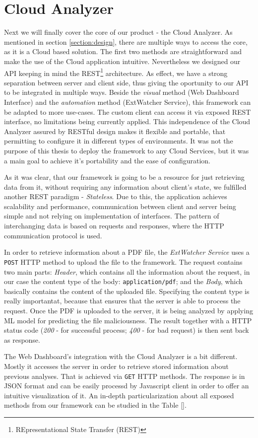 \section{Cloud Analyzer}
\label{section:cloudApi}
Next we will finally cover the core of our product - the Cloud Analyzer. As mentioned in section \ref{section:design}, there are multiple ways to access the core, as it is a Cloud based solution. The first two methods are straightforward and make the use of the Cloud application intuitive. Nevertheless we designed our API keeping in mind the REST\footnote{REpresentational State Transfer (REST)} architecture. As effect, we have a strong separation between server and client side, thus giving the oportunity to our API to be integrated in multiple ways. Beside the \textit{visual} method (Web Dashboard Interface) and the \textit{automation} method (ExtWatcher Service), this framework can be adapted to more use-cases. The custom client can access it via exposed REST interface, no limitations being currently applied. This independence of the Cloud Analyzer assured by RESTful design makes it flexible and portable, that permitting to configure it in different types of environments. It was not the purpose of this thesis to deploy the framework to any Cloud Services, but it was a main goal to achieve it's portability and the ease of configuration. \par 
As it was clear, that our framework is going to be a resource for just retrieving data from it, without requiring any information about client's state, we fulfilled another REST paradigm - \textit{Stateless}. Due to this, the application achieves scalability and performance, communication between client and server being simple and not relying on implementation of interfaces. The pattern of interchanging data is based on requests and responses, where the HTTP communication protocol is used. \par
In order to retrieve information about a PDF file, the \textit{ExtWatcher Service} uses a \texttt{POST} HTTP method to upload the file to the framework. The request contains two main parts: \textit{Header}, which contains all the information about the request, in our case the content type of the body: \texttt{application/pdf}; and the \textit{Body}, which basically contains the content of the uploaded file. Specifying the content type is really importantat, because that ensures that the server is able to process the request. Once the PDF is uploaded to the server, it is being analyzed by applying ML model for predicting the file maliciousness. The result together with a HTTP status code (\textit{200} - for successful process; \textit{400} - for bad request) is then sent back as response. \par
The Web Dashboard's integration with the Cloud Analyzer is a bit different. Mostly it accesses the server in order to retrieve stored information about previous analyses. That is achieved via \texttt{GET} HTTP methods. The response is in JSON format and can be easily processd by Javascript client in order to offer an intuitive visualization of it. An in-depth particularization about all exposed methods from our framework can be studied in the Table \ref{}.

